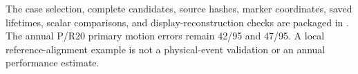 The case selection, complete candidates, source hashes, marker coordinates, saved lifetimes, scalar comparisons, and display-reconstruction checks are packaged in . The annual P/R20 primary motion errors remain 42/95 and 47/95. A local reference-alignment example is not a physical-event validation or an annual performance estimate.
